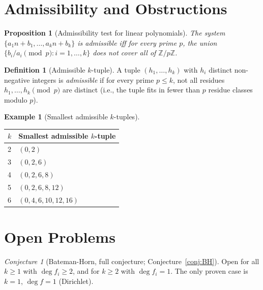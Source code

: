 \documentclass[12pt,a4paper]{amsart}
\newtheorem{proposition}[theorem]{Proposition}
\theoremstyle{definition}
\newtheorem{definition}[theorem]{Definition}
\newtheorem{example}[theorem]{Example}
\theoremstyle{remark}
\newtheorem{conjecture}[theorem]{Conjecture}
\newcommand{\Z}{\mathbb{Z}}
\begin{document}
\section{Admissibility and Obstructions}\label{sec:admissibility}

\begin{proposition}[Admissibility test for linear polynomials]
  The system $\{a_1 n + b_1, \ldots, a_k n + b_k\}$ is admissible iff for every prime $p$,
  the union $\{b_i/a_i \pmod{p} : i = 1,\ldots,k\}$ does not cover all of $\Z/p\Z$.
\end{proposition}

\begin{definition}[Admissible $k$-tuple]
  A tuple $(h_1,\ldots,h_k)$ with $h_i$ distinct non-negative integers is
  \emph{admissible} if for every prime $p \leq k$, not all residues
  $h_1,\ldots,h_k \pmod{p}$ are distinct (i.e., the tuple fits in fewer than $p$
  residue classes modulo $p$).
\end{definition}

\begin{example}[Smallest admissible $k$-tuples]
  \begin{center}
    \begin{tabular}{ll}
      \toprule
      $k$ & Smallest admissible $k$-tuple \\
      \midrule
      2 & $(0, 2)$ \\
      3 & $(0, 2, 6)$ \\
      4 & $(0, 2, 6, 8)$ \\
      5 & $(0, 2, 6, 8, 12)$ \\
      6 & $(0, 4, 6, 10, 12, 16)$ \\
      \bottomrule
    \end{tabular}
  \end{center}
\end{example}

\section{Open Problems}\label{sec:openproblems}

\begin{conjecture}[Bateman-Horn, full conjecture; Conjecture~\ref{conj:BH}]
  Open for all $k \geq 1$ with $\deg f_i \geq 2$, and for $k \geq 2$ with $\deg f_i = 1$.
  The only proven case is $k=1$, $\deg f = 1$ (Dirichlet).
\end{conjecture}
\end{document}
